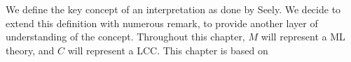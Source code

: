 We define the key concept of an interpretation  as done by Seely. We decide to extend this definition with numerous remark, to provide another layer of understanding of the concept. Throughout this chapter, $M$ will represent a ML theory, and $C$ will represent a LCC. This chapter is based on \cite[Section 4]{seely1984locally}


